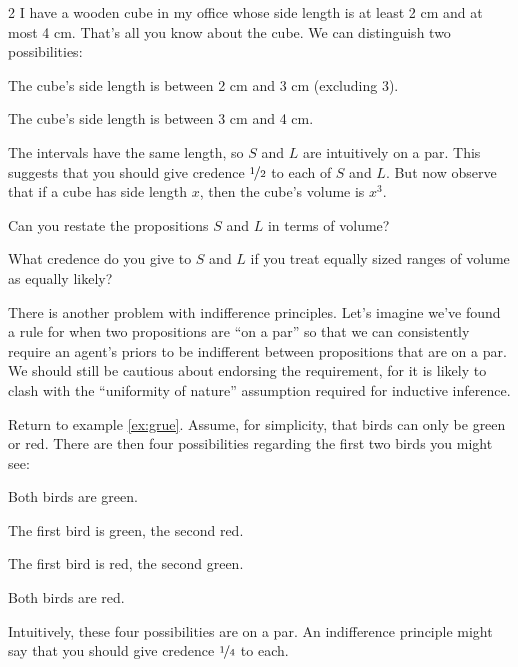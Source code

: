 \begin{exercise}{2}\label{e:cubefactory}
  I have a wooden cube in my office whose side length is at least 2 cm and at
  most 4 cm. That's all you know about the cube. We can distinguish two
  possibilities:
  \begin{enumerate*}
  \item[$S$:] The cube's side length is between 2 cm and 3 cm (excluding 3).
  \item[$L$:] The cube's side length is between 3 cm and 4 cm.
  \end{enumerate*}
  The intervals have the same length, so $S$ and $L$ are intuitively on a par.
  This suggests that you should give credence $\nicefrac{1}{2}$ to each of $S$
  and $L$. But now observe that if a cube has side length $x$, then the cube's
  volume is $x^3$.
  \begin{enumerate*}
  \item[(a)] Can you restate the propositions $S$ and $L$ in terms of
    volume?
  \item[(b)] What credence do you give to $S$ and $L$ if you treat equally
    sized ranges of volume as equally likely?
  \end{enumerate*}
  \vspace{-3mm}
\end{exercise}

There is another problem with indifference principles. Let's imagine we've found
a rule for when two propositions are ``on a par'' so that we can consistently
require an agent's priors to be indifferent between propositions that are on a
par. We should still be cautious about endorsing the requirement, for it is likely
to clash with the ``uniformity of nature'' assumption required for inductive
inference.

Return to example \ref{ex:grue}. Assume, for simplicity, that birds can only be green
or red. There are then four possibilities regarding the first two birds you
might see:
\begin{enumerate*}
\item[$GG$:] Both birds are green.
\item[$GR$:] The first bird is green, the second red.
\item[$RG$:] The first bird is red, the second green.
\item[$RR$:] Both birds are red. 
\end{enumerate*}
Intuitively, these four possibilities are on a par. An indifference principle
might say that you should give credence $\nicefrac{1}{4}$ to each.


